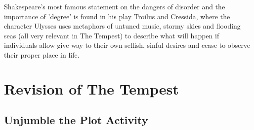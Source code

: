 			Shakespeare's most famous statement on the dangers of disorder and the importance of 'degree' is found in his play Troilus and Cressida, where the character Ulysses uses metaphors of untuned music, stormy skies and flooding seas (all very relevant in The Tempest) to describe what will happen if individuals allow give way to their own selfish, sinful desires and cease to observe their proper place in life. 

\newpage

\section{Revision of The Tempest} \label{12/02/2025}
	\subsection{Unjumble the Plot Activity}
